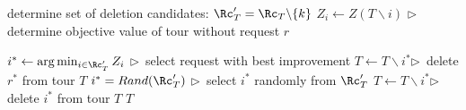 	\begin{algorithmic}[1]
		\State determine set of deletion candidates: $\Rc'_T = \Rc_T\backslash\{k\}$
				\State $Z_i \leftarrow Z(T\backslash i)$ {\hfill \small \hspace{.6cm}$\triangleright \,$ determine objective value of tour without request $r$}
				\EndFor
				
				\State $i^* \leftarrow \arg \min_{i \in \Rc'_T} Z_i$  {\hfill \small \hspace{.6cm}$\triangleright \,$ select request with best improvement }
				\State $T \leftarrow T\backslash i^*${\hfill \small \hspace{.6cm}$\triangleright \,$ delete $r^*$ from tour $T$}
		\EndIf
			\State $i^* = Rand(\Rc'_T)$  {\hfill \small \hspace{.6cm}$\triangleright \,$ select $i^*$ randomly from $\Rc'_T$}
			\State $T \leftarrow T\backslash i^*${\hfill \small \hspace{.6cm}$\triangleright \,$ delete $i^*$ from tour $T$}		
		\EndIf
		\State 	\Return $T$
		
		\EndProcedure
	\end{algorithmic}
